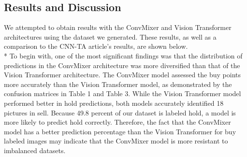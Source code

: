 \documentclass{article}
\begin{document}
\begin{center}
    \item\section{Results and Discussion}
\end{center}
We attempted to obtain results with the ConvMixer and Vision Transformer architectures using the dataset we generated. These results, as well as a comparison to the CNN-TA article's results, are shown below. \vspace{0.2cm}\\*
To begin with, one of the most significant findings was that the distribution of predictions in the ConvMixer architecture was more diversified than that of the Vision Transformer architecture. The ConvMixer model assessed the buy points more accurately than the Vision Transformer model, as demonstrated by the confusion matrices in Table 1 and Table 3. While the Vision Transformer model performed better in hold predictions, both models accurately identified 18 pictures in sell. Because 49.8 percent of our dataset is labeled hold, a model is more likely to predict hold correctly. Therefore, the fact that the ConvMixer model has a better prediction percentage than the Vision Transformer for buy labeled images may indicate that the ConvMixer model is more resistant to imbalanced datasets.
\end{document}
